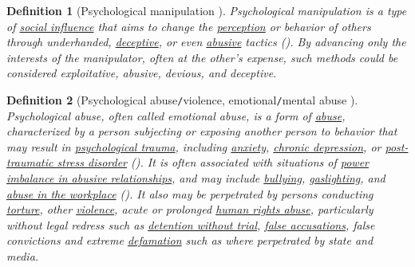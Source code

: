 \documentclass[12pt]{article}
\newtheorem{definition}{Definition}[section]
\begin{document}
\begin{definition}[Psychological manipulation \cite{Psychological Wiki/Psychological manipulation,Wikipedia/Pyschological manipulation}]
	\emph{Psychological manipulation} is a type of \href{https://psychology.wikia.org/wiki/Social_influence}{social influence} that aims to change the \href{https://en.wikipedia.org/wiki/Perception}{perception} or behavior of others through underhanded, \href{https://en.wikipedia.org/wiki/Deceptive}{deceptive}, or even \href{https://psychology.wikia.org/wiki/Abuse}{abusive} tactics (\cite{Braiker2004}). By advancing only the interests of the manipulator, often at the other's expense, such methods could be considered exploitative, abusive, devious, and deceptive.
\end{definition}

\begin{definition}[Psychological abuse{\tt/}violence, emotional{\tt/}mental abuse \cite{Psychology Wiki/Abusive relationship,Wikipedia/Psychological abuse}]
	\emph{Psychological abuse}, often called \emph{emotional abuse}, is a form of \href{https://en.wikipedia.org/wiki/Abuse}{abuse}, characterized by a person subjecting or exposing another person to behavior that may result in \href{https://en.wikipedia.org/wiki/Psychological_trauma}{psychological trauma}, including \href{https://en.wikipedia.org/wiki/Anxiety_disorder}{anxiety}, \href{https://en.wikipedia.org/wiki/Chronic_depression}{chronic depression}, or \href{https://en.wikipedia.org/wiki/Post-traumatic_stress_disorder}{post-traumatic stress disorder} (\cite{Dutton1994,Dutton_Goodman_Bennett2000,Thompson_Kaplan1996}). It is often associated with situations of \href{https://en.wikipedia.org/wiki/Abusive_power_and_control}{power imbalance in abusive relationships}, and may include \href{https://en.wikipedia.org/wiki/Bullying}{bullying}, \href{https://en.wikipedia.org/wiki/Gaslighting}{gaslighting}, and \href{https://en.wikipedia.org/wiki/Workplace_bullying}{abuse in the workplace} (\cite{Dutton_Goodman_Bennett2000,Thompson_Kaplan1996}). It also may be perpetrated by persons conducting \href{https://en.wikipedia.org/wiki/Torture}{torture}, other \href{https://en.wikipedia.org/wiki/Violence}{violence}, acute or prolonged \href{https://en.wikipedia.org/wiki/Human_rights_abuse}{human rights abuse}, particularly without legal redress such as \href{https://en.wikipedia.org/wiki/Detention_without_trial}{detention without trial}, \href{https://en.wikipedia.org/wiki/False_accusation}{false accusations}, false convictions and extreme \href{https://en.wikipedia.org/wiki/Defamation}{defamation} such as where perpetrated by state and media. 
\end{definition}
\end{document}
